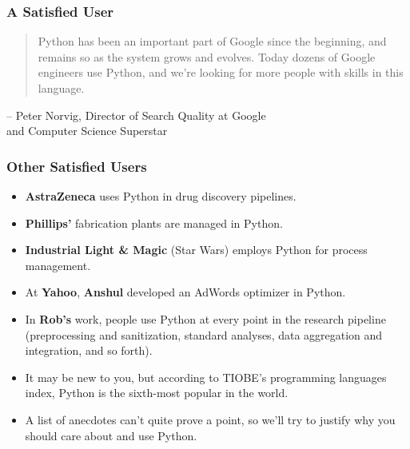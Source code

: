 \documentclass[10pt]{beamer}
\begin{document}
\begin{frame}
  \frametitle{A Satisfied User}
  \begin{quote}
      Python has been an important part of Google since the beginning, and remains so as the system grows and evolves. Today dozens of Google engineers use Python, and we're looking for more people with skills in this language.
  \end{quote}
  \begin{flushright}
    \footnotesize
    -- Peter Norvig, Director of Search Quality at Google \\ and Computer Science Superstar
  \end{flushright}
\end{frame}

\begin{frame}
  \frametitle{Other Satisfied Users}
  \begin{itemize}
    \item \textbf{AstraZeneca} uses Python in drug discovery pipelines.
    \item \textbf{Phillips'} fabrication plants are managed in Python.
    \item \textbf{Industrial Light \& Magic} (Star Wars) employs Python for process management.
    \item At \textbf{Yahoo}, \textbf{Anshul} developed an AdWords optimizer in Python.
    \item In \textbf{Rob's} work, people use Python at every point in the research pipeline (preprocessing and sanitization, standard analyses, data aggregation and integration, and so forth).
    \item It may be new to you, but according to TIOBE's programming languages index, Python is the sixth-most popular in the world.
    \item A list of anecdotes can't quite prove a point, so we'll try to justify why you should care about and use Python.
  \end{itemize}
\end{frame}
\end{document}

